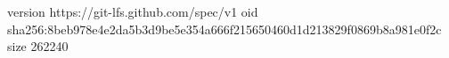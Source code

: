 version https://git-lfs.github.com/spec/v1
oid sha256:8beb978e4e2da5b3d9be5e354a666f215650460d1d213829f0869b8a981e0f2c
size 262240
